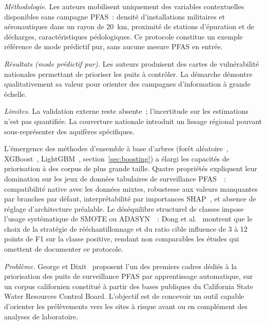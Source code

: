 \emph{M\'ethodologie.}
Les auteurs mobilisent uniquement des variables contextuelles disponibles sans campagne PFAS~: densit\'e d'installations militaires et a\'eronautiques dans un rayon de 20~km, proximit\'e de stations d'\'epuration et de d\'echarges, caract\'eristiques p\'edologiques.
Ce protocole constitue un exemple r\'ef\'erence de mode pr\'edictif pur, sans aucune mesure PFAS en entr\'ee.

\emph{R\'esultats (mode pr\'edictif pur).}
Les auteurs produisent des cartes de vuln\'erabilit\'e nationales permettant de prioriser les puits \`a contr\^oler.
La d\'emarche d\'emontre qualitativement sa valeur pour orienter des campagnes d'information \`a grande \'echelle.

\emph{Limites.}
La validation externe reste absente~; l'incertitude sur les estimations n'est pas quantifi\'ee.
La couverture nationale introduit un lissage r\'egional pouvant sous-repr\'esenter des aquif\`eres sp\'ecifiques.


\label{sec:chap2-ensemble}

L'\'emergence des m\'ethodes d'ensemble \`a base d'arbres (for\^et al\'eatoire~\cite{breiman2001rf}, XGBoost~\cite{chen2016xgboost}, LightGBM~\cite{ke2017lightgbm}, section~\ref{sec:boosting}) a \'elargi les capacit\'es de priorisation \`a des corpus de plus grande taille.
Quatre propri\'et\'es expliquent leur domination sur les jeux de donn\'ees tabulaires de surveillance PFAS~\cite{borisov2024tabular}~: compatibilit\'e native avec les donn\'ees mixtes, robustesse aux valeurs manquantes par branches par d\'efaut, interpr\'etabilit\'e par importances SHAP~\cite{lundberg2017shap}, et absence de r\'eglage d'architecture pr\'ealable.
Le d\'es\'equilibre structurel de classes impose l'usage syst\'ematique de SMOTE ou ADASYN~\cite{chawla2002smote,he2008adasyn}~: Dong et al.~\cite{dong2024pfas} montrent que le choix de la strat\'egie de r\'e\'echantillonnage et du ratio cible influence de 3 \`a 12 points de F1 sur la classe positive, rendant non comparables les \'etudes qui omettent de documenter ce protocole.


\label{sec:art-george2021}

\emph{Probl\`eme.}
George et Dixit~\cite{george2021pfas} proposent l'un des premiers cadres d\'edi\'es \`a la priorisation des puits de surveillance PFAS par apprentissage automatique, sur un corpus californien constitu\'e \`a partir des bases publiques du California State Water Resources Control Board.
L'objectif est de concevoir un outil capable d'orienter les pr\'el\`evements vers les sites \`a risque avant ou en compl\'ement des analyses de laboratoire.

